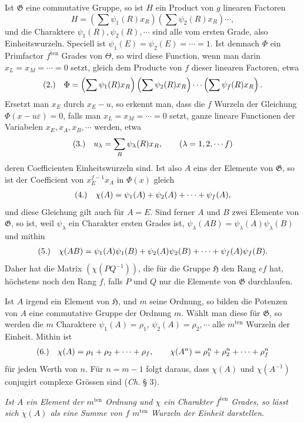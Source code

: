\documentclass[11pt]{article}
\makeatletter
\newcommand{\Hgrp}{\mathfrak{H}}
\newcommand{\Ggrp}{\mathfrak{G}}
\newcommand{\frobtagc}[2]{\[\begin{array}{@{}r@{\quad}c@{}}\textup{(#1)} & \displaystyle #2\end{array}\]}
\makeatother
\begin{document}
Ist $\Ggrp$ eine commutative Gruppe, so ist $H$ ein Product von $g$ linearen Factoren
\[
H=\left(\sum\psi_1(R)x_R\right)\left(\sum\psi_2(R)x_R\right)\cdots,
\]
und die Charaktere $\psi_1(R),\psi_2(R),\cdots$ sind alle vom ersten Grade, also Einheitswurzeln. Speciell ist $\psi_1(E)=\psi_2(E)=\cdots=1$. Ist demnach $\Phi$ ein Primfactor $f^{\mathrm{ten}}$ Grades von $\Theta$, so wird diese Function, wenn man darin $x_L=x_M=\cdots=0$ setzt, gleich dem Producte von $f$ dieser linearen Factoren, etwa
\frobtagc{2.}{\Phi=\left(\sum\psi_1(R)x_R\right)\left(\sum\psi_2(R)x_R\right)\cdots\left(\sum\psi_f(R)x_R\right).}
Ersetzt man $x_E$ durch $x_E-u$, so erkennt man, dass die $f$ Wurzeln der Gleichung $\Phi(x-u\varepsilon)=0$, falls man $x_L=x_M=\cdots=0$ setzt, ganze lineare Functionen der Variabelen $x_E,x_A,x_B,\cdots$ werden, etwa
\frobtagc{3.}{u_\lambda=\sum_R\psi_\lambda(R)x_R,\qquad (\lambda=1,2,\cdots f)}
deren Coefficienten Einheitswurzeln sind. Ist also $A$ eins der Elemente von $\Ggrp$, so ist der Coefficient von $x_E^{f-1}x_A$ in $\Phi(x)$ gleich
\frobtagc{4.}{\chi(A)=\psi_1(A)+\psi_2(A)+\cdots+\psi_f(A),}
und diese Gleichung gilt auch für $A=E$. Sind ferner $A$ und $B$ zwei Elemente von $\Ggrp$, so ist, weil $\psi_\lambda$ ein Charakter ersten Grades ist, $\psi_\lambda(AB)=\psi_\lambda(A)\psi_\lambda(B)$ und mithin
\frobtagc{5.}{\chi(AB)=\psi_1(A)\psi_1(B)+\psi_2(A)\psi_2(B)+\cdots+\psi_f(A)\psi_f(B).}
Daher hat die Matrix $(\chi(PQ^{-1}))$, die für die Gruppe $\Hgrp$ den Rang $ef$ hat, höchstens noch den Rang $f$, falls $P$ und $Q$ nur die Elemente von $\Ggrp$ durchlaufen.

Ist $A$ irgend ein Element von $\Hgrp$, und $m$ seine Ordnung, so bilden die Potenzen von $A$ eine commutative Gruppe der Ordnung $m$. Wählt man diese für $\Ggrp$, so werden die $m$ Charaktere $\psi_1(A)=\rho_1$, $\psi_2(A)=\rho_2,\cdots$ alle $m^{\mathrm{ten}}$ Wurzeln der Einheit. Mithin ist
\frobtagc{6.}{\chi(A)=\rho_1+\rho_2+\cdots+\rho_f,\qquad \chi(A^n)=\rho_1^n+\rho_2^n+\cdots+\rho_f^n}
für jeden Werth von $n$. Für $n=m-1$ folgt daraus, dass $\chi(A)$ und $\chi(A^{-1})$ conjugirt complexe Grössen sind (\emph{Ch.} § 3).

\emph{Ist $A$ ein Element der $m^{\mathrm{ten}}$ Ordnung und $\chi$ ein Charakter $f^{\mathrm{ten}}$ Grades, so lässt sich $\chi(A)$ als eine Summe von $f$ $m^{\mathrm{ten}}$ Wurzeln der Einheit darstellen.}
\end{document}
